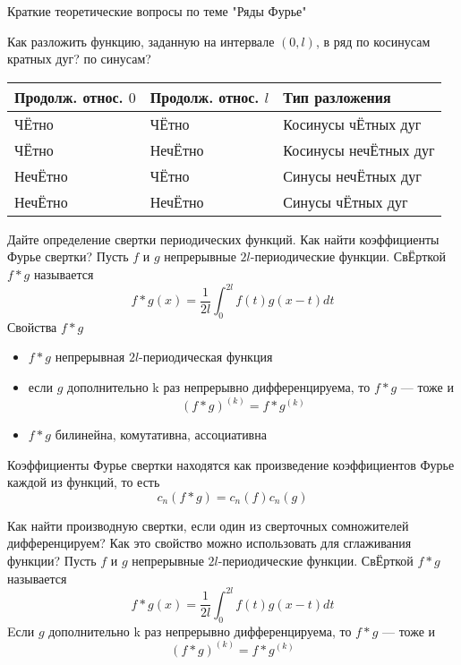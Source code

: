 \documentclass{article}
\begin{document}
\begin{section}{Краткие теоретические вопросы по теме "Ряды Фурье"}
\begin{subsection}{Как разложить функцию, заданную на интервале $(0, l)$, в ряд по косинусам кратных дуг? по синусам?}
\begin{table}[h]
	\begin{tabular}{|l|l|l|}
		\hline
		Продолж. относ. $0$     	 & Продолж. относ. $l$ 	& Тип разложения        \\ \hline
		Ч{\footnotesize Ё}тно                        & Ч{\footnotesize Ё}тно                        & Косинусы ч{\footnotesize Ё}тных дуг   \\ \hline
		Ч{\footnotesize Ё}тно                        & Неч{\footnotesize Ё}тно                      & Косинусы неч{\footnotesize Ё}тных дуг \\ \hline
		Неч{\footnotesize Ё}тно                      & Ч{\footnotesize Ё}тно                        & Синусы неч{\footnotesize Ё}тных дуг     \\ \hline
		Неч{\footnotesize Ё}тно                      & Неч{\footnotesize Ё}тно                      & Синусы ч{\footnotesize Ё}тных дуг   \\ \hline
	\end{tabular}
\end{table}

\end{subsection}


\begin{subsection}{Дайте определение свертки периодических функций. Как найти коэффициенты Фурье свертки?}
Пусть $f$ и $g$ непрерывные $2l$-периодические функции. Св{\footnotesize Ё}рткой $f*g$ называется 
\[f*g(x) = \frac{1}{2l}\int_0^{2l}f(t)g(x-t)dt\]
Свойства $f*g$
\begin{itemize}
	\item
	$f*g$ непрерывная $2l$-периодическая функция
	\item
	если $g$ дополнительно k раз непрерывно дифференцируема, то $f*g$ --- тоже и 
	\[(f*g)^{(k)} = f*g^{(k)}\]
	\item
	$f*g$ билинейна, комутативна, ассоциативна
\end{itemize}

Коэффициенты Фурье свертки находятся как произведение коэффициентов Фурье каждой из функций, то есть
\[c_n(f*g)=c_n(f)c_n(g)\]
\end{subsection}


\begin{subsection}{Как найти производную свертки, если один из сверточных сомножителей дифференцируем? Как это свойство можно использовать для сглаживания функции?}
Пусть $f$ и $g$ непрерывные $2l$-периодические функции. Св{\footnotesize Ё}рткой $f*g$ называется 
\[f*g(x) = \frac{1}{2l}\int_0^{2l}f(t)g(x-t)dt\]
Eсли $g$ дополнительно k раз непрерывно дифференцируема, то $f*g$ --- тоже и 
\[(f*g)^{(k)} = f*g^{(k)}\]


\end{subsection}
\end{section}
\end{document}
